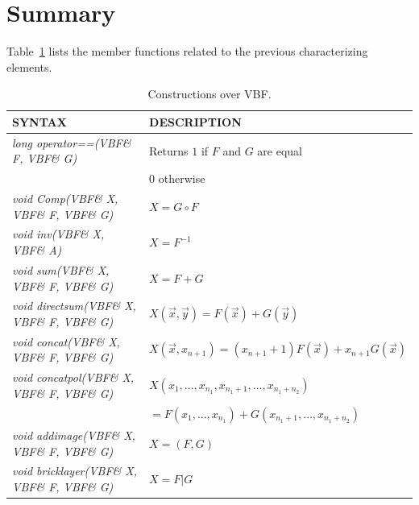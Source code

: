 \section{Summary}

Table~\ref{tab:Operations} lists the member functions related to the
previous characterizing elements.

\begin{table}[htbp]
\caption{Constructions over VBF.}
\centering
\label{tab:Operations}
\begin{tabular}{ l l }
\toprule
SYNTAX & DESCRIPTION \\
\midrule
\textit{long operator==(VBF\& F, VBF\& G)} & Returns $1$ if $F$ and $G$ are equal \\
& 0 otherwise \\
\textit{void Comp(VBF\& X, VBF\& F, VBF\& G)} & $X = G \circ F$ \\
\textit{void inv(VBF\& X, VBF\& A)} & $X = F^{-1}$ \\
\textit{void sum(VBF\& X, VBF\& F, VBF\& G)} & $X = F+G$ \\
\textit{void directsum(VBF\& X, VBF\& F, VBF\& G)} & $X(\vec{x},\vec{y}) = F(\vec{x}) + G(\vec{y})$ \\
\textit{void concat(VBF\& X, VBF\& F, VBF\& G)} & $X(\vec{x},x_{n+1}) =\left( x_{n+1}+1 \right) F(\vec{x})+ x_{n+1} G(\vec{x})$ \\
\textit{void concatpol(VBF\& X, VBF\& F, VBF\& G)} & $X(x_1,\ldots,x_{n_1},x_{n_1+1},\ldots,x_{n_1+n_2})$ \\
& $= F(x_1,\ldots,x_{n_1})+G(x_{n_1+1},\ldots,x_{n_1+n_2})$ \\
\textit{void addimage(VBF\& X, VBF\& F, VBF\& G)} & $X = (F,G)$ \\
\textit{void bricklayer(VBF\& X, VBF\& F, VBF\& G)} & $X = F | G$ \\
\bottomrule
\end{tabular}
\end{table}
